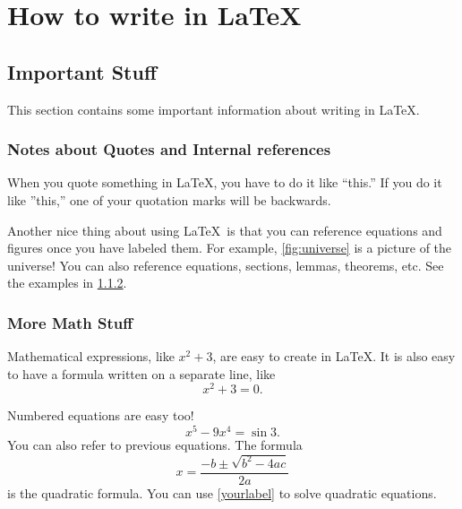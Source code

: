 \chapter{How to write in \LaTeX}

\section{Important Stuff}

This section contains some important information about writing in \LaTeX.

\subsection{Notes about Quotes and Internal references}

When you quote something in \LaTeX, you have to do it like ``this.''
If you do it like ''this,'' one of your quotation marks will be backwards.

Another nice thing about using \LaTeX \ is that you can reference 
equations and figures once you have labeled them. For example,
\cref{fig:universe} is a picture of the universe! You can also 
reference equations, sections, lemmas, theorems, etc. See the
examples in \cref{sec:moremath}.



\subsection{More Math Stuff}
\label{sec:moremath}

Mathematical expressions, like $x^{2} + 3$, are easy to create in \LaTeX.
It is also easy to have a formula written on a separate line, like \[x^{2} + 3 = 0.\]



Numbered equations are easy too!
\begin{equation}
	\label{eq:simpleequation}
	x^{5} - 9x^{4} = \sin 3.
\end{equation}
You can also refer to previous equations.
The formula
\begin{equation}
	x = \frac{-b \pm \sqrt{b^{2} - 4ac}}{2a} \label{yourlabel}
\end{equation}
is the quadratic formula.
You can use \cref{yourlabel} to solve quadratic equations.


